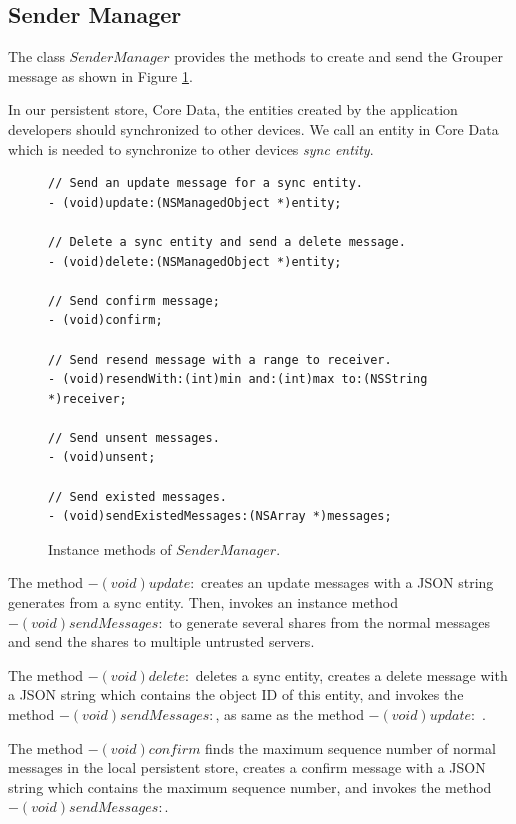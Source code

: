 \documentclass[a4paper,11pt]{report}
\begin{document}
\subsection{Sender Manager} \label{subsection:sender_manager}

The class $SenderManager$ provides the methods to create and send the Grouper message as shown in Figure \ref{fig:sender_manager}.

In our persistent store, Core Data\cite{coredata}, the entities created by the application developers should synchronized to other devices.
We call an entity in Core Data which is needed to synchronize to other devices \emph{sync entity}.

\begin{figure}
\begin{lstlisting}[frame=none language=Objective-C] 
// Send an update message for a sync entity.
- (void)update:(NSManagedObject *)entity;

// Delete a sync entity and send a delete message.
- (void)delete:(NSManagedObject *)entity;

// Send confirm message;
- (void)confirm;

// Send resend message with a range to receiver.
- (void)resendWith:(int)min and:(int)max to:(NSString *)receiver;

// Send unsent messages.
- (void)unsent;

// Send existed messages.
- (void)sendExistedMessages:(NSArray *)messages;	
\end{lstlisting}
\caption{Instance methods of $SenderManager$.}
\label{fig:sender_manager}
\end{figure}

The method $- (void)update:$ creates an update messages with a JSON string generates from a sync entity. Then, invokes an instance method $- (void)sendMessages:$ to generate several shares from the normal messages and send the shares to multiple untrusted servers.

The method $- (void)delete:$ deletes a sync entity, creates a delete message with a JSON string which contains the object ID of this entity, and invokes the method $- (void)sendMessages:$, as same as the method $- (void)update:$ .

The method $- (void)confirm$ finds the maximum sequence number of normal messages in the local persistent store, creates a confirm message with a JSON string which contains the maximum sequence number, and invokes the method $- (void)sendMessages:$.
\end{document}
